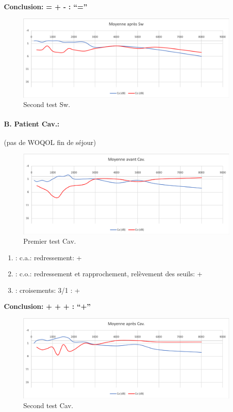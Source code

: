                 \textbf{  Conclusion:  = +  -        : ``=''}

                \begin{figure}
\centering
\includegraphics[width=0.7\linewidth]{images/graphiques/sw_post.png}
\caption[Moyenne OG+OD]{Second test Sw.}

\end{figure}




\paragraph{B. Patient Cav.: }

(pas de WOQOL fin de séjour)


\begin{figure}[th]
\centering
\includegraphics[width=0.7\linewidth]{images/graphiques/cav_pre.png}
\caption[Moyenne OG+OD]{Premier test Cav.}

\end{figure}

	\begin{enumerate}

 		\item : c.a.: redressement: +

 		\item : c.o.: redressement et rapprochement, relèvement des seuils: +
 		\item : croisements: 3/1 :  +

                \end{enumerate}

                \textbf{  Conclusion:  + + +       : ``+''}

                \begin{figure}
\centering
\includegraphics[width=0.7\linewidth]{images/graphiques/cav_post.png}
\caption[Moyenne OG+OD]{Second test Cav.}

                \end{figure}




